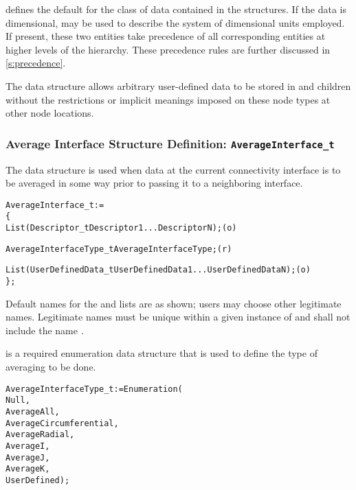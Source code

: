  defines the default for the class of data contained in
the  structures.
If the data is dimensional,  may be used to
describe the system of dimensional units employed.
If present, these two entities take precedence of all corresponding
entities at higher levels of the hierarchy.
These precedence rules are further discussed in \autoref{s:precedence}.

The  data structure allows arbitrary
user-defined data to be stored in  and
 children without the restrictions or implicit
meanings imposed on these node types at other node locations.

\subsubsection{Average Interface Structure Definition: \texttt{AverageInterface\_t}}
\label{s:AverageInterface}

The  data structure is used when data at the
current connectivity interface is to be averaged in some way prior to
passing it to a neighboring interface.

\begin{alltt}
  AverageInterface\_t :=
    \{
    List( Descriptor\_t Descriptor1 ... DescriptorN ) ;                      (o)

    AverageInterfaceType\_t AverageInterfaceType ;                           (r)

    List( UserDefinedData\_t UserDefinedData1 ... UserDefinedDataN ) ;       (o)
    \} ;
\end{alltt}

\begin{notes}
\item
 Default names for the  and
  lists are as shown; users may choose other
 legitimate names.
 Legitimate names must be unique within a given instance of
  and shall not include the name
 .
\end{notes}

 is a required enumeration data structure
that is used to define the type of averaging to be done.
\begin{alltt}
  AverageInterfaceType_t := Enumeration(
    Null,
    AverageAll,
    AverageCircumferential,
    AverageRadial,
    AverageI,
    AverageJ,
    AverageK,
    UserDefined ) ;
\end{alltt}

